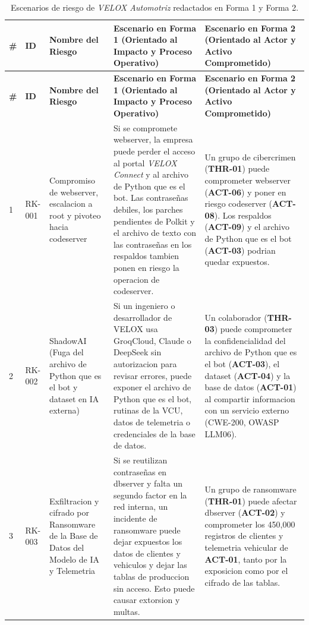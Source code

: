 \documentclass[letterpaper,11pt]{article}
\begin{document}
\begingroup
\scriptsize
\setlength{\tabcolsep}{3.5pt}
\renewcommand{\arraystretch}{1.28}
\noindent
\begin{longtable}{|C{0.6cm}|C{1.3cm}|L{2.8cm}|L{5.8cm}|L{5.8cm}|}
\caption{Escenarios de riesgo de \textit{VELOX Automotriz} redactados en Forma 1 y Forma 2.}
\label{tab:escenarios-formas} \\
\hline
{}
\textbf{\#}
  & \textbf{ID}
  & \textbf{Nombre del Riesgo}
  & \textbf{Escenario en Forma 1 (Orientado al Impacto y Proceso
Operativo)}
  & \textbf{Escenario en Forma 2 (Orientado al Actor y Activo
Comprometido)} \\
\hline
\endfirsthead
\hline
{}
\textbf{\#}
  & \textbf{ID}
  & \textbf{Nombre del Riesgo}
  & \textbf{Escenario en Forma 1 (Orientado al Impacto y Proceso
Operativo)}
  & \textbf{Escenario en Forma 2 (Orientado al Actor y Activo
Comprometido)} \\
\hline
\endhead
\hline
\endlastfoot

1
  & RK-001
  & Compromiso de webserver, escalacion a root y pivoteo hacia
codeserver
  & Si se compromete webserver, la empresa puede perder el acceso al
portal \textit{VELOX Connect} y al archivo de Python que es el bot.
Las contraseñas debiles, los parches pendientes de Polkit y el
archivo de texto con las contraseñas en los respaldos tambien ponen
en riesgo la operacion de codeserver.
  & Un grupo de cibercrimen (\textbf{THR-01}) puede comprometer
webserver (\textbf{ACT-06}) y poner en riesgo codeserver
(\textbf{ACT-08}). Los respaldos (\textbf{ACT-09}) y el archivo de
Python que es el bot (\textbf{ACT-03}) podrian quedar expuestos. \\
\hline

2
  & RK-002
  & ShadowAI (Fuga del archivo de Python que es el bot y dataset en IA
externa)
  & Si un ingeniero o desarrollador de VELOX usa GroqCloud, Claude o
DeepSeek sin autorizacion para revisar errores, puede exponer el
archivo de Python que es el bot, rutinas de la VCU, datos de
telemetria o credenciales de la base de datos.
  & Un colaborador (\textbf{THR-03}) puede comprometer la
confidencialidad del archivo de Python que es el bot
(\textbf{ACT-03}), el dataset (\textbf{ACT-04}) y la base de datos
(\textbf{ACT-01}) al compartir informacion con un servicio externo
(CWE-200, OWASP LLM06). \\
\hline

3
  & RK-003
  & Exfiltracion y cifrado por Ransomware de la Base de Datos del
Modelo de IA y Telemetria
  & Si se reutilizan contraseñas en dbserver y falta un segundo factor
en la red interna, un incidente de ransomware puede dejar expuestos
los datos de clientes y vehiculos y dejar las tablas de produccion
sin acceso. Esto puede causar extorsion y multas.
  & Un grupo de ransomware (\textbf{THR-01}) puede afectar dbserver
(\textbf{ACT-02}) y comprometer los 450,000 registros de clientes y
telemetria vehicular de \textbf{ACT-01}, tanto por la exposicion
como por el cifrado de las tablas. \\
\hline


\end{longtable}
\end{document}
